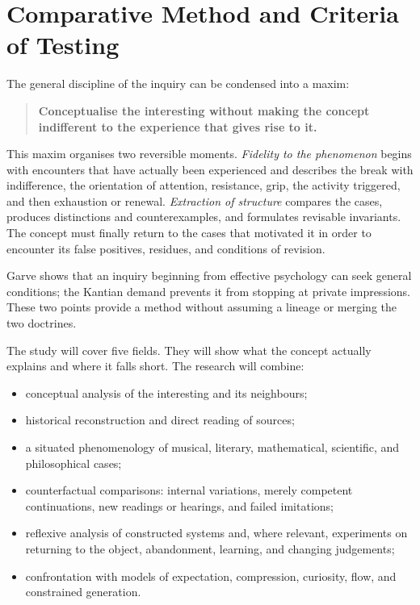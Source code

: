 \documentclass[11pt,a4paper]{article}
\begin{document}
\section{Comparative Method and Criteria of Testing}

The general discipline of the inquiry can be condensed into a maxim:

\begin{quote}
\textbf{Conceptualise the interesting without making the concept indifferent to
the experience that gives rise to it.}
\end{quote}

This maxim organises two reversible moments. \emph{Fidelity to the phenomenon}
begins with encounters that have actually been experienced and describes the
break with indifference, the orientation of attention, resistance, grip, the
activity triggered, and then exhaustion or renewal. \emph{Extraction of
structure} compares the cases, produces distinctions and counterexamples, and
formulates revisable invariants. The concept must finally return to the cases
that motivated it in order to encounter its false positives, residues, and
conditions of revision.

Garve shows that an inquiry beginning from effective psychology can seek general
conditions; the Kantian demand prevents it from stopping at private impressions.
These two points provide a method without assuming a lineage or merging the two
doctrines.

The study will cover five fields. They will show what the concept actually
explains and where it falls short. The research will combine:

\begin{itemize}
  \item conceptual analysis of the interesting and its neighbours;
  \item historical reconstruction and direct reading of sources;
  \item a situated phenomenology of musical, literary, mathematical,
        scientific, and philosophical cases;
  \item counterfactual comparisons: internal variations, merely competent
        continuations, new readings or hearings, and failed imitations;
  \item reflexive analysis of constructed systems and, where relevant,
        experiments on returning to the object, abandonment, learning, and changing
        judgements;
  \item confrontation with models of expectation, compression, curiosity,
        flow, and constrained generation.
\end{itemize}
\end{document}
